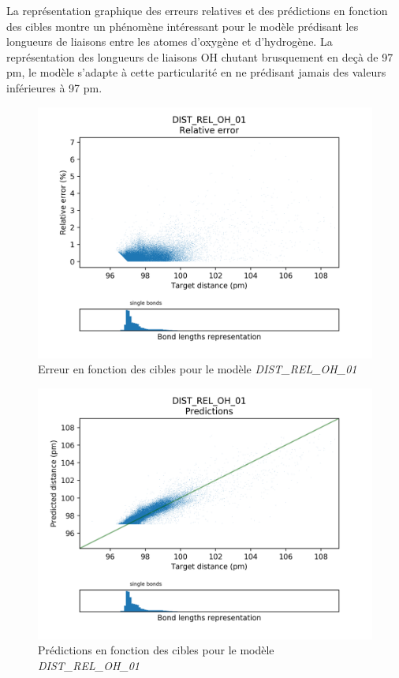 \par La représentation graphique des erreurs relatives et des prédictions en fonction des cibles montre un phénomène intéressant pour le modèle prédisant les longueurs de liaisons entre les atomes d'oxygène et d'hydrogène. La représentation des longueurs de liaisons OH chutant brusquement en deçà de 97 pm, le modèle s'adapte à cette particularité en ne prédisant jamais des valeurs inférieures à 97 pm.

\begin{figure}[!h]
	\centering
	
	\includegraphics[scale=0.7]{../figures/DIST_REL_OH_01/DIST_REL_OH_01_distrib_rmse_dist.png}	
	
	\caption{Erreur en fonction des cibles pour le modèle \emph{DIST\_REL\_OH\_01}}
	\end{figure}
	
\begin{figure}[!h]
	\centering
	
	\includegraphics[scale=0.7]{../figures/DIST_REL_OH_01/DIST_REL_OH_01_preds_targets.png}	
	
	\caption{Prédictions en fonction des cibles pour le modèle \emph{DIST\_REL\_OH\_01}}
	
\end{figure}


